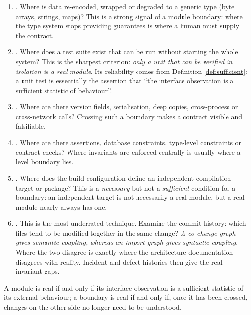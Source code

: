 \begin{enumerate}[label=(S\arabic*)]
\item {}. Where is data re-encoded, wrapped or degraded to a
      generic type (byte arrays, strings, maps)? This is a strong signal of a module boundary:
      where the type system stops providing guarantees is where a human must supply the
      contract.
\item {}. Where does a test suite exist that can be
      run without starting the whole system? This is the sharpest criterion: \emph{only a unit
      that can be verified in isolation is a real module}. Its reliability comes from
      Definition \ref{def:sufficient}: a unit test is essentially the assertion that ``the
      interface observation is a sufficient statistic of behaviour''.
\item {}. Where are there version
      fields, serialisation, deep copies, cross-process or cross-network calls? Crossing such
      a boundary makes a contract visible and falsifiable.
\item {}. Where are there assertions, database
      constraints, type-level constraints or contract checks? Where invariants are enforced
      centrally is usually where a level boundary lies.
\item {}. Where does the build configuration
      define an independent compilation target or package? This is a \emph{necessary} but not a
      \emph{sufficient} condition for a boundary: an independent target is not necessarily a
      real module, but a real module nearly always has one.
\item {}. This is the most underrated technique.
      Examine the commit history: which files tend to be modified together in the same change?
      \emph{A co-change graph gives semantic coupling, whereas an import graph gives syntactic
      coupling}. Where the two disagree is exactly where the architecture documentation
      disagrees with reality. Incident and defect histories then give the real invariant gaps.
\end{enumerate}

\begin{principle}\label{pr:seam-summary}
A module is real if and only if its interface observation is a sufficient statistic of its
external behaviour; a boundary is real if and only if, once it has been crossed, changes on
the other side no longer need to be understood.
\end{principle}

